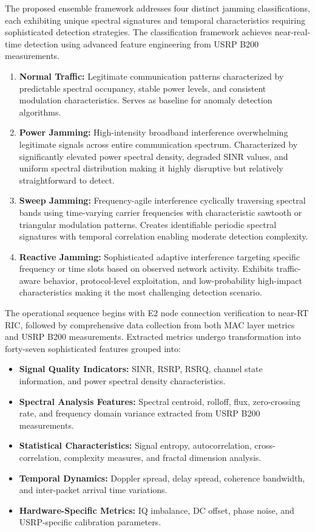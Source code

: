 \documentclass[journal]{IEEEtran}
\begin{document}
The proposed ensemble framework addresses four distinct jamming classifications, each exhibiting unique spectral signatures and temporal characteristics requiring sophisticated detection strategies. The classification framework achieves near-real-time detection using advanced feature engineering from USRP B200 measurements.

\begin{enumerate}
    \item \textbf{Normal Traffic:} Legitimate communication patterns characterized by predictable spectral occupancy, stable power levels, and consistent modulation characteristics. Serves as baseline for anomaly detection algorithms.

    \item \textbf{Power Jamming:} High-intensity broadband interference overwhelming legitimate signals across entire communication spectrum. Characterized by significantly elevated power spectral density, degraded SINR values, and uniform spectral distribution making it highly disruptive but relatively straightforward to detect.

    \item \textbf{Sweep Jamming:} Frequency-agile interference cyclically traversing spectral bands using time-varying carrier frequencies with characteristic sawtooth or triangular modulation patterns. Creates identifiable periodic spectral signatures with temporal correlation enabling moderate detection complexity.

    \item \textbf{Reactive Jamming:} Sophisticated adaptive interference targeting specific frequency or time slots based on observed network activity. Exhibits traffic-aware behavior, protocol-level exploitation, and low-probability high-impact characteristics making it the most challenging detection scenario.
\end{enumerate}

The operational sequence begins with E2 node connection verification to near-RT RIC, followed by comprehensive data collection from both MAC layer metrics and USRP B200 measurements. Extracted metrics undergo transformation into forty-seven sophisticated features grouped into:

\begin{itemize}
    \item \textbf{Signal Quality Indicators:} SINR, RSRP, RSRQ, channel state information, and power spectral density characteristics.
    \item \textbf{Spectral Analysis Features:} Spectral centroid, rolloff, flux, zero-crossing rate, and frequency domain variance extracted from USRP B200 measurements.
    \item \textbf{Statistical Characteristics:} Signal entropy, autocorrelation, cross-correlation, complexity measures, and fractal dimension analysis.
    \item \textbf{Temporal Dynamics:} Doppler spread, delay spread, coherence bandwidth, and inter-packet arrival time variations.
    \item \textbf{Hardware-Specific Metrics:} IQ imbalance, DC offset, phase noise, and USRP-specific calibration parameters.
\end{itemize}
\end{document}
